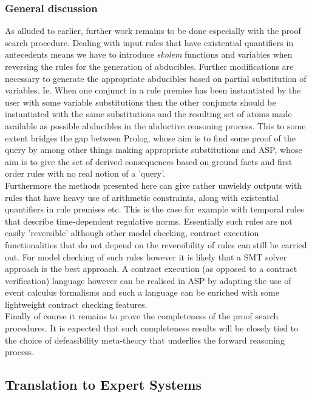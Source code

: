 \subsubsection{General discussion}
As alluded to earlier, further work remains to be done especially with the proof search procedure. Dealing with input rules that have existential quantifiers in antecedents means we have to introduce \emph{skolem} functions and variables when reversing the rules for the generation of abducibles. Further modifications are necessary to generate the appropriate abducibles based on partial substitution of variables. Ie. When one conjunct in a rule premise has been instantiated by the user with some variable substitutions then the other conjuncts should be instantiated with the same substitutions and the resulting set of atoms made available as possible abducibles in the  abductive reasoning process. This to some extent bridges the gap between Prolog, whose aim is to find some proof of the query by among other things making appropriate substitutions and ASP, whose aim is to give the set of derived consequences based on ground facts and first order rules with no real notion of a 'query'.\\
Furthermore the methods presented here can give rather unwieldy outputs with rules that have heavy use of arithmetic constraints, along with existential quantifiers in rule premises etc. This is the case for example with temporal rules that describe time-dependent regulative norms. Essentially such rules are not easily 'reversible' although other model checking, contract execution functionalities that do not depend on the reversibility of rules can still be carried out. For model checking of such rules however it is likely that a SMT solver approach is the best approach. A contract execution (as opposed to a contract verification) language however can be realised in ASP by adapting the use of event calculus formalisms and such a language can be enriched with some lightweight contract checking features.\\
Finally of course it remains to prove the completeness of the proof search procedures. It is expected that such completeness results will be closely tied to the choice of defeasibility meta-theory that underlies the forward reasoning process.
\subsection{Translation to Expert Systems}\label{sec:translation_expertsystem}

